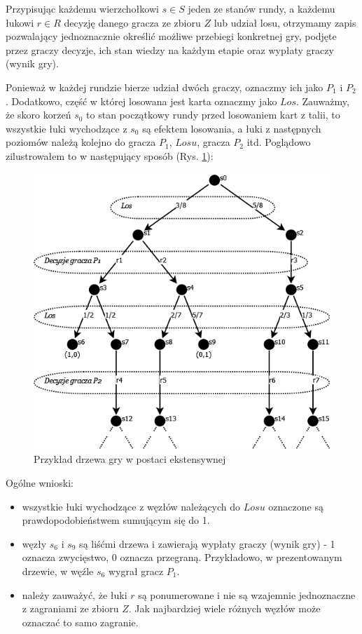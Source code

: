 Przypisując każdemu wierzchołkowi $s \in S$ jeden ze stanów rundy, a każdemu łukowi $r \in R$ decyzję danego gracza ze zbioru $Z$ lub udział losu, otrzymamy zapis pozwalający jednoznacznie określić możliwe przebiegi konkretnej gry, podjęte przez graczy decyzje, ich stan wiedzy na każdym etapie oraz wypłaty graczy (wynik gry).

Ponieważ w każdej rundzie bierze udział dwóch graczy, oznaczmy ich jako $P_1$ i $P_2$. Dodatkowo, część w której losowana jest karta oznaczmy jako $Los$. Zauważmy, że skoro korzeń $s_0$ to stan początkowy rundy przed losowaniem kart z talii, to wszystkie łuki wychodzące z $s_0$ są efektem losowania, a łuki z następnych poziomów należą kolejno do gracza $P_1$, $Losu$, gracza $P_2$ itd. Poglądowo zilustrowałem to w następujący sposób (Rys. \ref{fig:drzewo}):

\begin{figure}[h]
	\centering
	\includegraphics[scale=0.5]{Resources/drzewo2.png}
	\caption{Przykład drzewa gry w postaci ekstensywnej} 
	\label{fig:drzewo}
\end{figure}
Ogólne wnioski:
\begin{itemize}
	\item wszystkie łuki wychodzące z węzłów należących do $Losu$ oznaczone są prawdopodobieństwem sumującym się do 1.
	\item węzły $s_6$ i $s_9$ są liśćmi drzewa i zawierają wypłaty graczy (wynik gry) - 1 oznacza zwycięstwo, 0 oznacza przegraną. Przykładowo, w prezentowanym drzewie, w węźle $s_6$ wygrał gracz $P_1$.
	\item należy zauważyć, że łuki $r$ są ponumerowane i nie są wzajemnie jednoznaczne z zagraniami ze zbioru $Z$. Jak najbardziej wiele różnych węzłów może oznaczać to samo zagranie.
\end{itemize}

